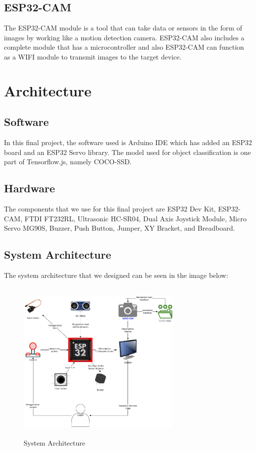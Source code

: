 \documentclass[conference]{IEEEtran}
\begin{document}
\subsection{ESP32-CAM}
The ESP32-CAM module is a tool that can take data or sensors in the form of images by working like a motion detection camera. ESP32-CAM also includes a complete module that has a microcontroller and also ESP32-CAM can function as a WIFI module to transmit images to the target device\cite{b7}.

\section{Architecture}
\subsection{Software}
In this final project, the software used is Arduino IDE which has added an ESP32 board and an ESP32 Servo library. The model used for object classification is one part of Tensorflow.js, namely COCO-SSD.

\subsection{Hardware}
The components that we use for this final project are ESP32 Dev Kit, ESP32-CAM, FTDI FT232RL, Ultrasonic HC-SR04, Dual Axis Joystick Module, Micro Servo MG90S, Buzzer, Push Button, Jumper, XY Bracket, and Breadboard.

\subsection{System Architecture}
The system architecture that we designed can be seen in the image below:
\begin{figure}[htbp]
\centerline{\includegraphics[width=8cm, height=8cm]{Lampiran/sysarch.png}}
\caption{System Architecture}
\label{sysarch}
\end{figure}
\end{document}
